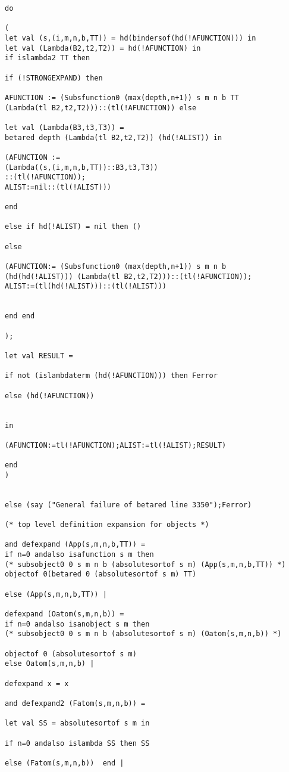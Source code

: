 \documentclass[12pt]{article}
\begin{document}
\begin{verbatim}
do

(
let val (s,(i,m,n,b,TT)) = hd(bindersof(hd(!AFUNCTION))) in
let val (Lambda(B2,t2,T2)) = hd(!AFUNCTION) in
if islambda2 TT then

if (!STRONGEXPAND) then 

AFUNCTION := (Subsfunction0 (max(depth,n+1)) s m n b TT 
(Lambda(tl B2,t2,T2)))::(tl(!AFUNCTION)) else 

let val (Lambda(B3,t3,T3)) = 
betared depth (Lambda(tl B2,t2,T2)) (hd(!ALIST)) in

(AFUNCTION := 
(Lambda((s,(i,m,n,b,TT))::B3,t3,T3))
::(tl(!AFUNCTION));
ALIST:=nil::(tl(!ALIST)))

end

else if hd(!ALIST) = nil then ()

else 

(AFUNCTION:= (Subsfunction0 (max(depth,n+1)) s m n b 
(hd(hd(!ALIST))) (Lambda(tl B2,t2,T2)))::(tl(!AFUNCTION));
ALIST:=(tl(hd(!ALIST)))::(tl(!ALIST))) 


end end

);

let val RESULT =

if not (islambdaterm (hd(!AFUNCTION))) then Ferror

else (hd(!AFUNCTION))


in

(AFUNCTION:=tl(!AFUNCTION);ALIST:=tl(!ALIST);RESULT)

end
)


else (say ("General failure of betared line 3350");Ferror)

(* top level definition expansion for objects *)

and defexpand (App(s,m,n,b,TT)) = 
if n=0 andalso isafunction s m then
(* subsobject0 0 s m n b (absolutesortof s m) (App(s,m,n,b,TT)) *)
objectof 0(betared 0 (absolutesortof s m) TT)

else (App(s,m,n,b,TT)) |

defexpand (Oatom(s,m,n,b)) = 
if n=0 andalso isanobject s m then
(* subsobject0 0 s m n b (absolutesortof s m) (Oatom(s,m,n,b)) *)

objectof 0 (absolutesortof s m)
else Oatom(s,m,n,b) |

defexpand x = x

and defexpand2 (Fatom(s,m,n,b)) =

let val SS = absolutesortof s m in

if n=0 andalso islambda SS then SS

else (Fatom(s,m,n,b))  end |


\end{verbatim}
\end{document}
